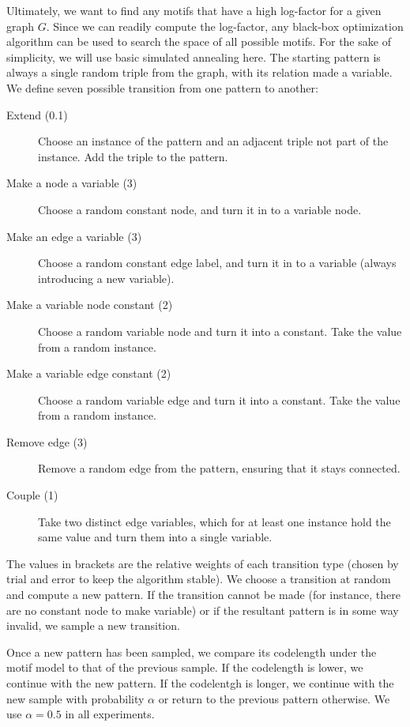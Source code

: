\documentclass[letterpaper]{article} %
\begin{document}
Ultimately, we want to find any motifs that have a high log-factor for a given graph $G$. Since we can readily compute the log-factor, any black-box optimization algorithm can be used to search the space of all possible motifs. For the sake of simplicity, we will use basic simulated annealing here. The starting pattern is always a single random triple from the graph, with its relation made a variable. We define seven possible transition from one pattern to another:
\begin{description}
	\item[Extend (0.1)] Choose an instance of the pattern and an adjacent triple not part of the instance. Add the triple to the pattern.
	\item[Make a node a variable (3)] Choose a random constant node, and turn it in to a variable node.
	\item[Make an edge a variable (3)] Choose a random constant edge label, and turn it in to a variable (always introducing a new variable).
	\item[Make a variable node constant (2)] Choose a random variable node and turn it into a constant. Take the value from a random instance.
	\item[Make a variable edge constant (2)] Choose a random variable edge and turn it into a constant. Take the value from a random instance.
	\item[Remove edge (3)] Remove a random edge from the pattern, ensuring that it stays connected.
	\item[Couple (1)] Take two distinct edge variables, which for at least one instance hold the same value and turn them into a single variable.
\end{description}

The values in brackets are the relative weights of each transition type (chosen by trial and error to keep the algorithm stable). We choose a transition at random and compute a new pattern. If the transition cannot be made (for instance, there are no constant node to make variable) or if the resultant pattern is in some way invalid, we sample a new transition.

Once a new pattern has been sampled, we compare its codelength under the motif model to that of the previous sample. If the codelength is lower, we continue with the new pattern. If the codelentgh is longer, we continue with the new sample with probability $\alpha$ or return to the previous pattern otherwise. We use $\alpha = 0.5$ in all experiments.
\end{document}
